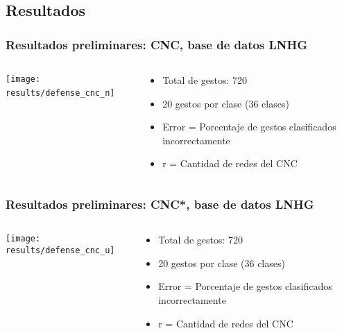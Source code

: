 \subsection{Resultados}
\begin{myframe}
\frametitle{Resultados preliminares: CNC, base de datos LNHG}
\begin{columns}
\begin{column}{0.7\textwidth}
\centering
\texttt{[image: results/defense\_cnc\_n]}
\
\end{column}
\begin{column}{0.3\textwidth}
  \begin{itemize}
  \centering
  \item Total de gestos: 720 
  \item 20 gestos por clase (36 clases)
  \item Error = Porcentaje de gestos clasificados incorrectamente
  \item r = Cantidad de redes del CNC
  \end{itemize}
\end{column}
\end{columns}

\end{myframe}

\begin{myframe}
\frametitle{Resultados preliminares: CNC*, base de datos LNHG}
\begin{columns}
\begin{column}{0.7\textwidth}
\centering
\texttt{[image: results/defense\_cnc\_u]}
\end{column}
\begin{column}{0.3\textwidth}
  \begin{itemize}
  \centering
  \item Total de gestos: 720 
  \item 20 gestos por clase (36 clases)
  \item Error = Porcentaje de gestos clasificados incorrectamente
  \item r = Cantidad de redes del CNC
  \end{itemize}
\end{column}
\end{columns}

\end{myframe}

